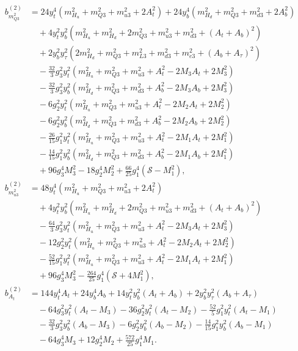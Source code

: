 \documentclass[preprint,amsmath,amssymb,aps,superscriptaddress,prd,showpacs,floatfix,nofootinbib]{revtex4-1}
\begin{document}
\begin{subequations}\label{eq:MSSMsEffPotCoeffs}
\begin{align}
b_{m_{Q3}^2}^{(2)}&=24y_t^4\left ( m_{H_u}^2+m_{Q3}^2+m_{u3}^2+2A_t^2\right )+24y_b^4\left ( m_{H_d}^2+m_{Q3}^2+m_{d3}^2+2A_b^2\right )\nonumber\\
&\quad{}+4y_t^2y_b^2\left ( m_{H_u}^2+m_{H_d}^2+2m_{Q3}^2+m_{u3}^2+m_{d3}^2+(A_t+A_b)^2\right )\nonumber\\
&\quad{}+2y_b^2y_\tau^2\left ( 2m_{H_d}^2+m_{Q3}^2+m_{L3}^2+m_{d3}^2+m_{e3}^2+(A_b+A_\tau)^2\right )\nonumber\\
&\quad{}-\frac{32}{3}g_3^2y_t^2\left ( m_{H_u}^2+m_{Q3}^2+m_{u3}^2+A_t^2-2M_3A_t+2M_3^2\right )\nonumber\\
&\quad{}-\frac{32}{3}g_3^2y_b^2\left ( m_{H_d}^2+m_{Q3}^2+m_{d3}^2+A_b^2-2M_3A_b+2M_3^2\right )\nonumber\\
&\quad{}-6g_2^2y_t^2\left ( m_{H_u}^2+m_{Q3}^2+m_{u3}^2+A_t^2-2M_2A_t+2M_2^2\right )\nonumber\\
&\quad{}-6g_2^2y_b^2\left ( m_{H_d}^2+m_{Q3}^2+m_{d3}^2+A_b^2-2M_2A_b+2M_2^2\right )\nonumber\\
&\quad{}-\frac{26}{15}g_1^2y_t^2\left ( m_{H_u}^2+m_{Q3}^2+m_{u3}^2+A_t^2-2M_1A_t+2M_1^2\right )\nonumber\\
&\quad{}-\frac{14}{15}g_1^2y_b^2\left ( m_{H_d}^2+m_{Q3}^2+m_{d3}^2+A_b^2-2M_1A_b+2M_1^2\right )\nonumber\\
&\quad{}+96g_3^4M_3^2-18g_2^4M_2^2+\frac{66}{25}g_1^4(\mathcal{S}-M_1^2),\label{eq:MSSMmQ32b2}\\
b_{m_{u3}^2}^{(2)}&=48y_t^4\left ( m_{H_u}^2+m_{Q3}^2+m_{u3}^2+2A_t^2\right )\nonumber\\
&\quad{}+4y_t^2y_b^2\left ( m_{H_u}^2+m_{H_d}^2+2m_{Q3}^2+m_{u3}^2+m_{d3}^2+(A_t+A_b)^2\right )\nonumber\\
&\quad{}-\frac{64}{3}g_3^2y_t^2\left ( m_{H_u}^2+m_{Q3}^2+m_{u3}^2+A_t^2-2M_3A_t+2M_3^2\right )\nonumber\\
&\quad{}-12g_2^2y_t^2\left ( m_{H_u}^2+m_{Q3}^2+m_{u3}^2+A_t^2-2M_2A_t+2M_2^2\right )\nonumber\\
&\quad{}-\frac{52}{15}g_1^2y_t^2\left ( m_{H_u}^2+m_{Q3}^2+m_{u3}^2+A_t^2-2M_1A_t+2M_1^2\right )\nonumber\\
&\quad{}+96g_3^4M_3^2-\frac{264}{25}g_1^4\left ( \mathcal{S}+4M_1^2\right ),\label{eq:MSSMmu32b2}\\
b_{A_t}^{(2)}&=144y_t^4A_t+24y_b^4A_b+14y_t^2y_b^2(A_t+A_b)+2y_b^2y_\tau^2(A_b+A_\tau)\nonumber\\
&\quad{}-64g_3^2y_t^2(A_t-M_3)-36g_2^2y_t^2(A_t-M_2)-\frac{52}{5}g_1^2y_t^2(A_t-M_1)\nonumber\\
&\quad{}-\frac{32}{3}g_3^2y_b^2(A_b-M_3)-6g_2^2y_b^2(A_b-M_2)-\frac{14}{15}g_1^2y_b^2(A_b-M_1)\nonumber\\
&\quad{}-64g_3^4M_3+12g_2^4M_2+\frac{572}{25}g_1^4M_1.\label{eq:MSSMAtb2}
\end{align}
\end{subequations}
\end{document}
